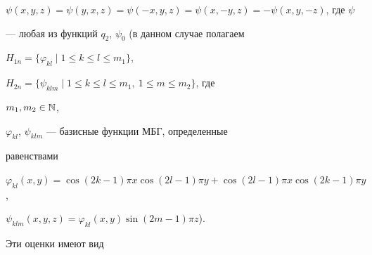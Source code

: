 $\psi(x,y,z)=\psi(y,x,z)=\psi(-x,y,z)=\psi(x,-y,z)=


-\psi(x,y,-z)$, где $\psi$


--- любая из функций $q_2$, $\psi_0$ (в данном случае полагаем


$H_{1n}=\{\varphi_{kl}\mid1\le k\le l\le m_1\}$,


$H_{2n}=\{\psi_{klm}\mid 1\le k\le l\le m_1, \ 1\le m\le m_2\}$, где


$m_1,m_2\in\Bbb N$,


$\varphi_{kl}$, $\psi_{klm}$ --- базисные функции МБГ, определенные


равенствами


$\varphi_{kl}(x,y)=\cos(2k-1)\pi x\cos(2l-1)\pi y+


\cos(2l-1)\pi x\cos(2k-1)\pi y$,


$\psi_{klm}(x,y,z)=\varphi_{kl}(x,y)\sin(2m-1)\pi z$).


Эти оценки имеют вид


